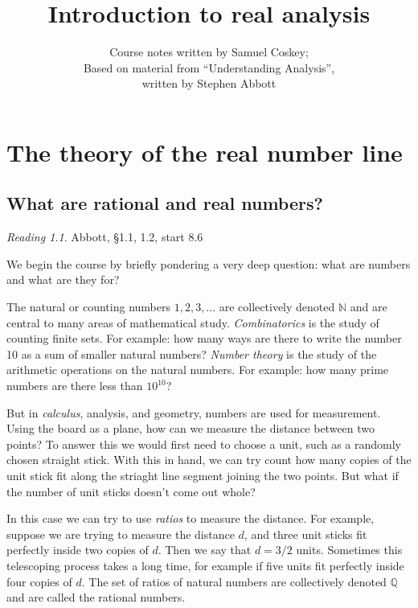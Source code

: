 \documentclass[11pt,oneside]{amsbook}
\title{Introduction to real analysis}
\author{Course notes written by Samuel Coskey;\\Based on material from ``Understanding Analysis'',\\written by Stephen Abbott}
\newcommand{\N}{\mathbb N}
\newcommand{\Q}{\mathbb Q}
\theoremstyle{definition}
\theoremstyle{plain}
\theoremstyle{definition}
\theoremstyle{remark}
\newtheorem*{reading}{Reading}
\numberwithin{equation}{section}
\numberwithin{figure}{section}
\begin{document}
\maketitle

\tableofcontents

\chapter{The theory of the real number line}

\section{What are rational and real numbers?}

\begin{reading}
  Abbott, \S 1.1, 1.2, start 8.6
\end{reading}


We begin the course by briefly pondering a very deep question: what are numbers and what are they for?

The natural or counting numbers $1,2,3,\ldots$ are collectively denoted $\N$ and are central to many areas of mathematical study. \emph{Combinatorics} is the study of counting finite sets. For example: how many ways are there to write the number 10 as a sum of smaller natural numbers? \emph{Number theory} is the study of the arithmetic operations on the natural numbers. For example: how many prime numbers are there less than $10^{10}$?

But in \emph{calculus}, analysis, and geometry, numbers are used for measurement. Using the board as a plane, how can we measure the distance between two points? To answer this we would first need to choose a unit, such as a randomly chosen straight stick. With this in hand, we can try count how many copies of the unit stick fit along the striaght line segment joining the two points. But what if the number of unit sticks doesn't come out whole?

In this case we can try to use \emph{ratios} to measure the distance. For example, suppose we are trying to measure the distance $d$, and three unit sticks fit perfectly inside two copies of $d$. Then we say that $d=3/2$ units. Sometimes this telescoping process takes a long time, for example if five units fit perfectly inside four copies of $d$. The set of ratios of natural numbers are collectively denoted $\Q$ and are called the rational numbers.
\end{document}
